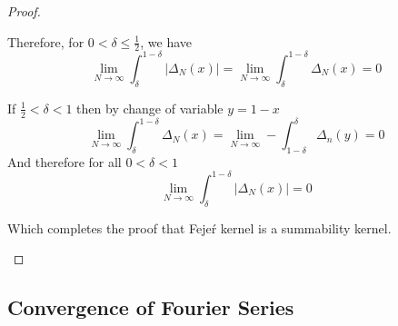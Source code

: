 \begin{proof}
\begin{enumerate}
        Therefore, for $0 < \delta \le \frac{1}{2}$, we have 
        \begin{displaymath}
          \lim_{N \to \infty} \int_\delta^{1-\delta} \left|\Delta_N(x)\right| = \lim_{N \to \infty} \int_\delta^{1-\delta} \Delta_N(x) = 0
        \end{displaymath}

        If $\frac{1}{2} < \delta < 1$ then by change of variable $y = 1 - x$
        \begin{displaymath}
          \lim_{N\to \infty} \int_\delta^{1-\delta} \Delta_N(x) = \lim_{N \to \infty} - \int_{1-\delta}^{\delta} \Delta_n(y) = 0
        \end{displaymath}
        And therefore for all $0 < \delta < 1$ 
        \begin{displaymath}
          \lim_{N \to \infty} \int_\delta^{1-\delta} \left|\Delta_N(x)\right| =  0
        \end{displaymath}


      Which completes the proof that  Feje\'r kernel is a summability kernel.
    \end{enumerate}
  \end{proof}


  \subsection{Convergence of Fourier Series} %
  \label{ssub:Convergence of Fourier Series}

